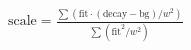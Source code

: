 \documentclass{article}
\begin{document}
$ \text{scale} = \frac{\sum (\text{fit} \cdot (\text{decay} - \text{bg}) / w^2)}{\sum (\text{fit}^2 / w^2)} $
\pagebreak
\end{document}
